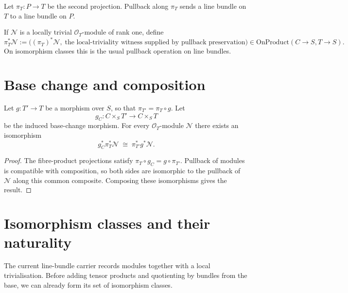 Let $\pi_T:P\to T$ be the second projection.  Pullback along $\pi_T$ sends a
line bundle on $T$ to a line bundle on $P$.

\begin{definition}\leanok
  \label{def:pullback_along_projection}
  If $\mathcal N$ is a locally trivial $\mathcal O_T$-module of rank one, define
  \[
    \pi_T^*\mathcal N
      :=\bigl((\pi_T)^*\mathcal N,\;\text{the local-triviality witness
         supplied by pullback preservation}\bigr)
      \in \mathrm{OnProduct}(C\to S,T\to S).
  \]
  On isomorphism classes this is the usual pullback operation on line bundles.
\end{definition}

\section{Base change and composition}
\label{sec:lbp_compose}

\begin{lemma}\leanok
  \label{lem:pullback_compose}
  Let $g:T'\to T$ be a morphism over $S$, so that
  $\pi_{T'}=\pi_T\circ g$.  Let
  \[
    g_C:C\times_S T'\longrightarrow C\times_S T
  \]
  be the induced base-change morphism.  For every $\mathcal O_T$-module
  $\mathcal N$ there exists an isomorphism
  \[
    g_C^*\pi_T^*\mathcal N
      \;\cong\;\pi_{T'}^*g^*\mathcal N.
  \]
\end{lemma}
\begin{proof}
  \leanok
  The fibre-product projections satisfy
  $\pi_T\circ g_C=g\circ\pi_{T'}$.  Pullback of modules is compatible with
  composition, so both sides are isomorphic to the pullback of $\mathcal N$
  along this common composite.  Composing these isomorphisms gives the result.
\end{proof}

\section{Isomorphism classes and their naturality}
\label{sec:lbp_relpic_quotient}

The current line-bundle carrier records modules together with a local
trivialisation.  Before adding tensor products and quotienting by bundles from
the base, we can already form its set of isomorphism classes.

